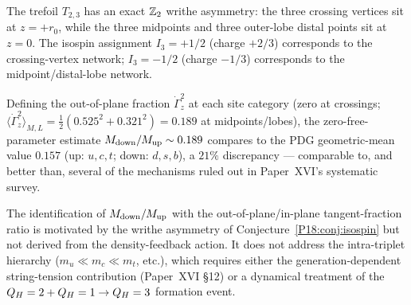 \begin{conjecture}
\label{P18:conj:isospin}
The trefoil $T_{2,3}$ has an exact $\mathbb{Z}_2$ writhe asymmetry: the
three crossing vertices sit at $z=+r_0$, while the three midpoints
and three outer-lobe distal points sit at $z=0$. The isospin
assignment $I_3=+1/2$ (charge $+2/3$) corresponds to the
crossing-vertex network; $I_3=-1/2$ (charge $-1/3$) corresponds to
the midpoint/distal-lobe network.
\end{conjecture}

\begin{proposition}
\label{P18:prop:isospin_mass_ratio}
Defining the out-of-plane fraction $\dot\Gamma_z^2$ at each site
category (zero at crossings; $\langle\dot\Gamma_z^2\rangle_{M,L}
=\tfrac12(0.525^2+0.321^2)=0.189$ at midpoints/lobes), the
zero-free-parameter estimate
$M_{\rm down}/M_{\rm up}\sim0.189$ compares to the PDG geometric-mean
value $0.157$ (up: $u,c,t$; down: $d,s,b$), a $21\%$ discrepancy ---
comparable to, and better than, several of the mechanisms ruled out
in Paper~XVI's systematic survey.
\end{proposition}

\begin{remark}
\label{P18:rem:isospin_mass_ratio_scope}
The identification of $M_{\rm down}/M_{\rm up}$ with the
out-of-plane/in-plane tangent-fraction ratio is motivated by the
writhe asymmetry of Conjecture~\ref{P18:conj:isospin} but not derived
from the density-feedback action. It does not address the
intra-triplet hierarchy ($m_u\ll m_c\ll m_t$, etc.), which requires
either the generation-dependent string-tension contribution
(Paper~XVI \S12) or a dynamical treatment of the
$Q_H=2+Q_H=1\to Q_H=3$ formation event.
\end{remark}

